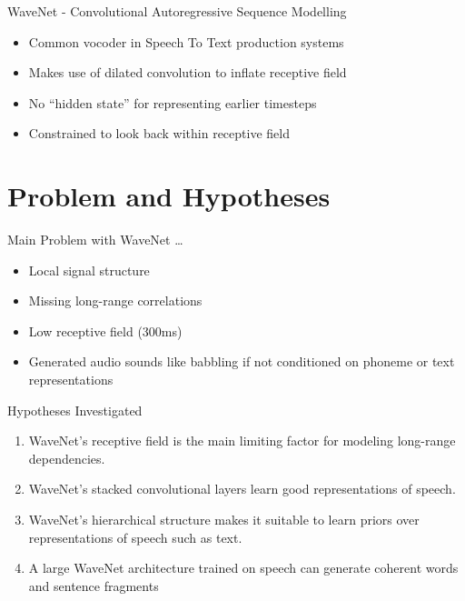\documentclass[
  ignorenonframetext,
  aspectratio=169,
]{beamer}
\providecommand{\tightlist}{%
  \setlength{\itemsep}{0pt}\setlength{\parskip}{0pt}}
\begin{document}
\begin{frame}{WaveNet - Convolutional Autoregressive Sequence Modelling}
\protect\hypertarget{wavenet---convolutional-autoregressive-sequence-modelling}{}
\begin{figure}
    \centering
    \resizebox{0.7\columnwidth}{!}{
    }
\end{figure}

\begin{itemize}
\tightlist
\item
  Common vocoder in Speech To Text production systems
\item
  Makes use of dilated convolution to inflate receptive field
\item
  No ``hidden state'' for representing earlier timesteps
\item
  Constrained to look back within receptive field
\end{itemize}
\end{frame}

\hypertarget{problem-and-hypotheses}{%
\section{Problem and Hypotheses}\label{problem-and-hypotheses}}

\begin{frame}{Main Problem with WaveNet \ldots{}}
\protect\hypertarget{main-problem-with-wavenet}{}
\begin{itemize}
\tightlist
\item
  Local signal structure\\
\item
  Missing long-range correlations
\item
  Low receptive field (300ms)
\item
  Generated audio sounds like babbling if not conditioned on phoneme or
  text representations
\end{itemize}
\end{frame}

\begin{frame}{Hypotheses Investigated}
\protect\hypertarget{hypotheses-investigated}{}
\begin{enumerate}
\tightlist
\item
  WaveNet's receptive field is the main limiting factor for modeling
  long-range dependencies.
\item
  WaveNet's stacked convolutional layers learn good representations of
  speech.
\item
  WaveNet's hierarchical structure makes it suitable to learn priors
  over representations of speech such as text.
\item
  A large WaveNet architecture trained on speech can generate coherent
  words and sentence fragments
\end{enumerate}
\end{frame}
\end{document}
